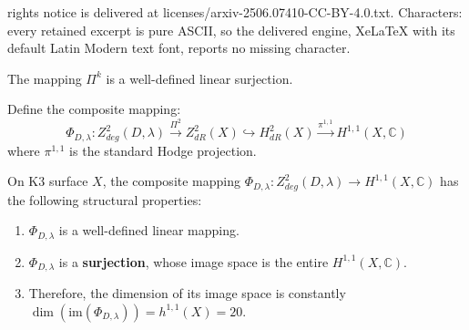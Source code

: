 \documentclass[10pt,a4paper]{amsart}
\begin{document}
rights notice is delivered at licenses/arxiv-2506.07410-CC-BY-4.0.txt. Characters: every retained excerpt is pure ASCII, so the delivered engine, XeLaTeX with its default Latin Modern text font, reports no missing character.
\begin{proposition}
\label{prop:projection_basic_properties}
The mapping $\Pi^k$ is a well-defined linear surjection.
\end{proposition}

\begin{definition}
\label{def:composite_map_to_11}
Define the composite mapping:
$$\Phi_{D,\lambda}: Z_{deg}^2(D,\lambda) \xrightarrow{\Pi^2} Z^2_{dR}(X) \hookrightarrow H^2_{dR}(X) \xrightarrow{\pi^{1,1}} H^{1,1}(X, \mathbb{C})$$
where $\pi^{1,1}$ is the standard Hodge projection.
\end{definition}

\begin{theorem}
\label{thm:composite_map_structure_and_surjectivity}
On K3 surface $X$, the composite mapping $\Phi_{D,\lambda}: Z_{deg}^2(D,\lambda) \to H^{1,1}(X, \mathbb{C})$ has the following structural properties:
\begin{enumerate}
    \item $\Phi_{D,\lambda}$ is a well-defined linear mapping.
    \item $\Phi_{D,\lambda}$ is a \textbf{surjection}, whose image space is the entire $H^{1,1}(X, \mathbb{C})$.
    \item Therefore, the dimension of its image space is constantly $\dim(\text{im}(\Phi_{D,\lambda})) = h^{1,1}(X) = 20$.
\end{enumerate}
\end{theorem}
\end{document}
